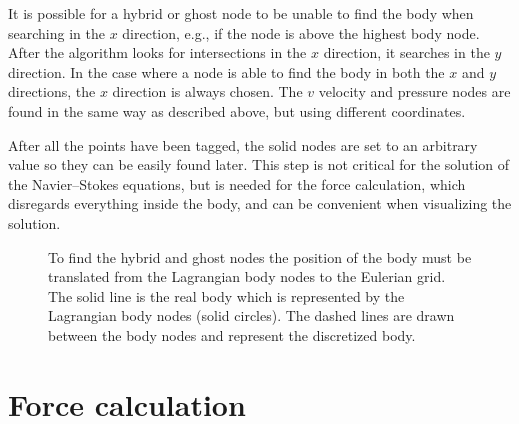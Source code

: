 It is possible for a hybrid or ghost node to be unable to find the body when searching in the $x$ direction, e.g., if the node is above the highest body node. 
After the algorithm looks for intersections in the $x$ direction, it searches in the $y$ direction. 
In the case where a node is able to find the body in both the $x$ and $y$ directions, the $x$ direction is always chosen. 
The $v$ velocity and pressure nodes are found in the same way as described above, but using different coordinates. 

After all the points have been tagged, the solid nodes are set to an arbitrary value so they can be easily found later.
This step is not critical for the solution of the Navier--Stokes equations, but is needed for the force calculation, which disregards everything inside the body, and can be convenient when visualizing the solution. 
\begin{figure}
	\centering
	
	\caption{To find the hybrid and ghost nodes the position of the body must be translated from the Lagrangian body nodes to the Eulerian grid. The solid line is the real body which is represented by the Lagrangian body nodes (solid circles). The dashed lines are drawn between the body nodes and represent the discretized body.}
	\label{fig:node id 1}
\end{figure}

\section{Force calculation}
\label{Force Calculation}

